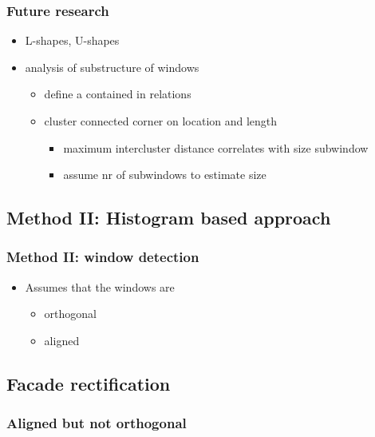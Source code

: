 \documentclass{beamer}
\begin{document}
\frame
{
	\frametitle{Future research}
	\begin{itemize}
	\item L-shapes, U-shapes
	\item analysis of substructure of windows
	\begin{itemize}
		\item define a contained in relations
		\item cluster connected corner on location and length
		\begin{itemize}
			\item maximum intercluster distance correlates with size subwindow
			\item assume nr of subwindows to estimate size
		\end{itemize}
	\end{itemize}
	\end{itemize}
}

\subsection{Method II: Histogram based approach} 
\frame
{
	\frametitle{Method II: window detection}
	\begin{itemize}
	\item Assumes that the windows are
	\begin{itemize}
		\item orthogonal
		\item aligned
	\end{itemize}
	\end{itemize}

}

\subsection{Facade rectification}
\frame
{
	\frametitle{Aligned but not orthogonal}
}
\end{document}
